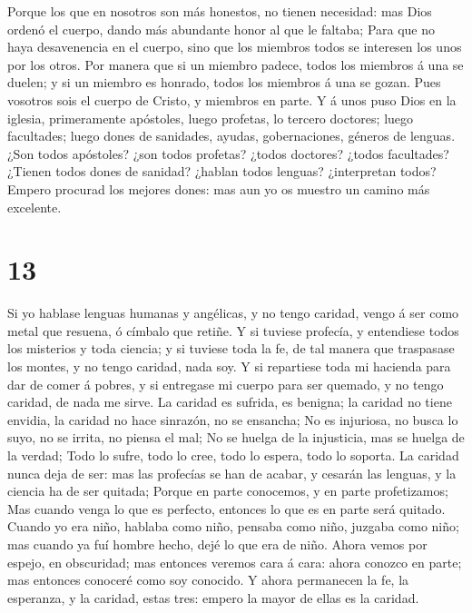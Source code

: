 Porque los que en nosotros son más honestos, no tienen necesidad: mas
Dios ordenó el cuerpo, dando más abundante honor al que le faltaba;
 Para que no haya desavenencia en el cuerpo, sino que los
miembros todos se interesen los unos por los otros.  Por
manera que si un miembro padece, todos los miembros á una se duelen; y
si un miembro es honrado, todos los miembros á una se gozan.
 Pues vosotros sois el cuerpo de Cristo, y miembros en
parte.  Y á unos puso Dios en la iglesia, primeramente
apóstoles, luego profetas, lo tercero doctores; luego facultades; luego
dones de sanidades, ayudas, gobernaciones, géneros de lenguas.
 ¿Son todos apóstoles? ¿son todos profetas? ¿todos
doctores? ¿todos facultades?  ¿Tienen todos dones de
sanidad? ¿hablan todos lenguas? ¿interpretan todos? 
Empero procurad los mejores dones: mas aun yo os muestro un camino más
excelente.

\hypertarget{section-12}{%
\section{13}\label{section-12}}

 Si yo hablase lenguas humanas y angélicas, y no tengo
caridad, vengo á ser como metal que resuena, ó címbalo que retiñe.
 Y si tuviese profecía, y entendiese todos los misterios y
toda ciencia; y si tuviese toda la fe, de tal manera que traspasase los
montes, y no tengo caridad, nada soy.  Y si repartiese
toda mi hacienda para dar de comer á pobres, y si entregase mi cuerpo
para ser quemado, y no tengo caridad, de nada me sirve. 
La caridad es sufrida, es benigna; la caridad no tiene envidia, la
caridad no hace sinrazón, no se ensancha;  No es
injuriosa, no busca lo suyo, no se irrita, no piensa el mal;
 No se huelga de la injusticia, mas se huelga de la
verdad;  Todo lo sufre, todo lo cree, todo lo espera, todo
lo soporta.  La caridad nunca deja de ser: mas las
profecías se han de acabar, y cesarán las lenguas, y la ciencia ha de
ser quitada;  Porque en parte conocemos, y en parte
profetizamos;  Mas cuando venga lo que es perfecto,
entonces lo que es en parte será quitado.  Cuando yo era
niño, hablaba como niño, pensaba como niño, juzgaba como niño; mas
cuando ya fuí hombre hecho, dejé lo que era de niño. 
Ahora vemos por espejo, en obscuridad; mas entonces veremos cara á cara:
ahora conozco en parte; mas entonces conoceré como soy conocido.
 Y ahora permanecen la fe, la esperanza, y la caridad,
estas tres: empero la mayor de ellas es la caridad.

